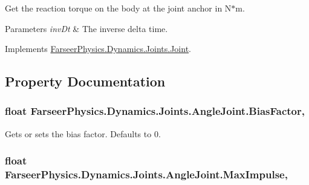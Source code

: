 Get the reaction torque on the body at the joint anchor in N$\ast$m. 


\begin{DoxyParams}{Parameters}
{\em inv\+Dt} & The inverse delta time.\\
\hline
\end{DoxyParams}


Implements \hyperlink{class_farseer_physics_1_1_dynamics_1_1_joints_1_1_joint_a21899d3bdf15c22ef4dc288ed2082cbc}{Farseer\+Physics.\+Dynamics.\+Joints.\+Joint}.



\subsection{Property Documentation}
\hypertarget{class_farseer_physics_1_1_dynamics_1_1_joints_1_1_angle_joint_aa7cc30868103af9703678ad8f9c6eb20}{
\subsubsection[{Bias\+Factor}]{\setlength{\rightskip}{0pt plus 5cm}float Farseer\+Physics.\+Dynamics.\+Joints.\+Angle\+Joint.\+Bias\+Factor\hspace{0.3cm}{\ttfamily [get]}, {\ttfamily [set]}}}\label{class_farseer_physics_1_1_dynamics_1_1_joints_1_1_angle_joint_aa7cc30868103af9703678ad8f9c6eb20}


Gets or sets the bias factor. Defaults to 0. 

\hypertarget{class_farseer_physics_1_1_dynamics_1_1_joints_1_1_angle_joint_a0b78b8b3752ab65c78c926177fd661b6}{
\subsubsection[{Max\+Impulse}]{\setlength{\rightskip}{0pt plus 5cm}float Farseer\+Physics.\+Dynamics.\+Joints.\+Angle\+Joint.\+Max\+Impulse\hspace{0.3cm}{\ttfamily [get]}, {\ttfamily [set]}}}\label{class_farseer_physics_1_1_dynamics_1_1_joints_1_1_angle_joint_a0b78b8b3752ab65c78c926177fd661b6}


